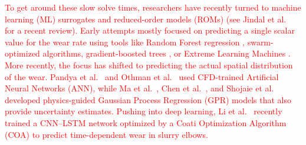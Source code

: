 \documentclass{article}
\begin{document}
\textcolor{red}{To get around these slow solve times, researchers have recently turned to machine learning (ML) surrogates and reduced-order models (ROMs) (see Jindal et al.~\cite{jindal2026artificial} for a recent review). Early attempts mostly focused on predicting a single scalar value for the wear rate using tools like Random Forest regression \cite{zahedi2018,yang2021experimental}, swarm-optimized algorithms, gradient-boosted trees \cite{wang2022solid,zhang2021solid}, or Extreme Learning Machines \cite{wang2022numerical,liu2021exploration}. More recently, the focus has shifted to predicting the actual spatial distribution of the wear. Pandya et al.~\cite{pandya2020cfd} and Othman et al.~\cite{othman2024integration} used CFD-trained Artificial Neural Networks (ANN), while Ma et al.~\cite{ma2024mechanism}, Chen et al.~\cite{chen2024novel}, and Shojaie et al.~\cite{shojaie2023method,shojaie2024comprehensive} developed physics-guided Gaussian Process Regression (GPR) models that also provide uncertainty estimates. Pushing into deep learning, Li et al.~\cite{li2026cfd} recently trained a CNN--LSTM network optimized by a Coati Optimization Algorithm (COA) to predict time-dependent wear in slurry elbows.}
\end{document}
